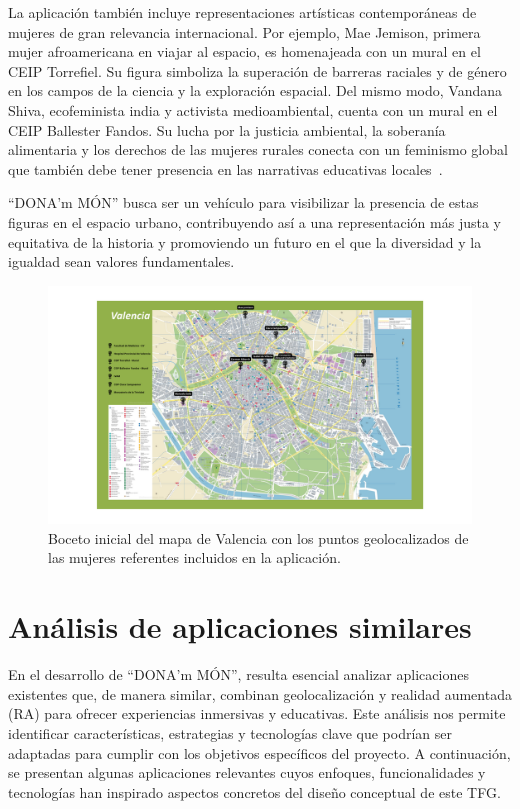 La aplicación también incluye representaciones artísticas contemporáneas de mujeres de gran relevancia internacional. Por ejemplo, Mae Jemison, primera mujer afroamericana en viajar al espacio, es homenajeada con un mural en el CEIP Torrefiel. Su figura simboliza la superación de barreras raciales y de género en los campos de la ciencia y la exploración espacial. Del mismo modo, Vandana Shiva, ecofeminista india y activista medioambiental, cuenta con un mural en el CEIP Ballester Fandos. Su lucha por la justicia ambiental, la soberanía alimentaria y los derechos de las mujeres rurales conecta con un feminismo global que también debe tener presencia en las narrativas educativas locales~\cite{shiva2005}.

“DONA’m MÓN” busca ser un vehículo para visibilizar la presencia de estas figuras en el espacio urbano, contribuyendo así a una representación más justa y equitativa de la historia y promoviendo un futuro en el que la diversidad y la igualdad sean valores fundamentales.

\begin{figure}[H]
    \centering
    \includegraphics[width=\textwidth]{figs/mapa.png}
    \caption{Boceto inicial del mapa de Valencia con los puntos geolocalizados de las mujeres referentes incluidos en la aplicación.}
    \label{fig:mapa_valencia_mujeres}
\end{figure}



\section{Análisis de aplicaciones similares}

En el desarrollo de “DONA’m MÓN”, resulta esencial analizar aplicaciones existentes que, de manera similar, combinan geolocalización y realidad aumentada (RA) para ofrecer experiencias inmersivas y educativas. Este análisis nos permite identificar características, estrategias y tecnologías clave que podrían ser adaptadas para cumplir con los objetivos específicos del proyecto. A continuación, se presentan algunas aplicaciones relevantes cuyos enfoques, funcionalidades y tecnologías han inspirado aspectos concretos del diseño conceptual de este TFG.

